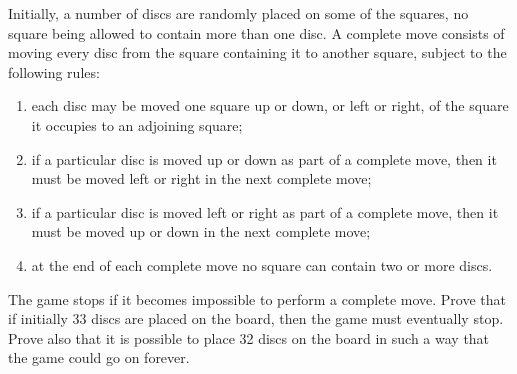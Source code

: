 \documentclass[12pt]{article}
\begin{document}
\begin{enumerate}
Initially, a number of discs are randomly placed on some of the squares, no square being allowed to contain more than one disc. A complete move consists of moving every disc from the square containing it to another square, subject to the following rules:
\begin{enumerate}
\item[(a)] each disc may be moved one square up or down, or left or right, of the square it occupies to an adjoining square;
\item[(b)] if a particular disc is moved up or down as part of a complete move, then it must be moved left or right in the next complete move;
\item[(c)] if a particular disc is moved left or right as part of a complete move, then it must be moved up or down in the next complete move;
\item[(d)] at the end of each complete move no square can contain two or more discs.
\end{enumerate}

The game stops if it becomes impossible to perform a complete move. Prove that if initially 33 discs are placed on the board, then the game must eventually stop. Prove also that it is possible to place 32 discs on the board in such a way that the game could go on forever.
\end{enumerate}
\end{document}
